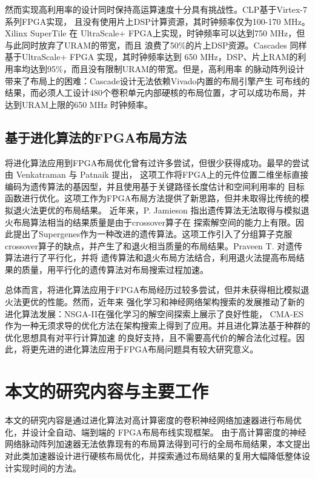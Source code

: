然而实现高利用率的设计同时保持高运算速度十分具有挑战性。CLP基于Virtex-7系列FPGA实现，
且没有使用片上DSP计算资源，其时钟频率仅为100-170 MHz。Xilinx SuperTile 在
UltraScale+ FPGA上实现，时钟频率可以达到750 MHz，但与此同时放弃了URAM的带宽，而且
浪费了50\%的片上DSP资源。Cascades 同样基于UltraScale+ FPGA 实现，其时钟频率达到
650 MHz，DSP、片上RAM的利用率均达到95\%，而且没有限制URAM的带宽。但是，高利用率
的脉动阵列设计带来了布局上的困难：Cascade设计无法依赖Vivado内置的布局引擎产生
可布线的结果，而必须人工设计480个卷积单元内部硬核的布局位置，才可以成功布局，并达到URAM上限的650 MHz
时钟频率。

\subsection{基于进化算法的FPGA布局方法}

将进化算法应用到FPGA布局优化曾有过许多尝试，但很少获得成功。最早的尝试由 Venkatraman 与 Patnaik 提出，
这项工作将FPGA上的元件位置二维坐标直接编码为遗传算法的基因型，并且使用基于关键路径长度估计和空间利用率的
目标函数进行优化。这项工作为FPGA布局方法提供了新思路，但并未取得比传统的模拟退火法更优的布局结果。
近年来，P. Jamieson 指出遗传算法无法取得与模拟退火布局算法相当的结果质量是由于crossover算子在
探索解空间的能力上有限。因此提出了Supergenes作为一种改进的遗传算法。这项工作引入了分组算子克服
crossover算子的缺点，并产生了和退火相当质量的布局结果。Praveen T. 对遗传算法进行了平行化，并将
遗传算法和退火布局方法结合，利用退火法提高布局结果的质量，用平行化的遗传算法对布局搜索过程加速。

总体而言，将进化算法应用于FPGA布局经历过较多尝试，但并未获得相比模拟退火法更优的性能。然而，近年来
强化学习和神经网络架构搜索的发展推动了新的进化算法发展：NSGA-II在强化学习的解空间探索上展示了良好性能，
CMA-ES作为一种无须求导的优化方法在架构搜索上得到了应用。并且进化算法基于种群的优化思想具有对平行计算加速
的良好支持，且不需要高代价的解合法化过程。因此，将更先进的进化算法应用于FPGA布局问题具有较大研究意义。



\section{本文的研究内容与主要工作}

本文的研究内容是通过进化算法对高计算密度的卷积神经网络加速器进行布局优化，并设计全自动、端到端的
FPGA布局布线实现框架。
由于高计算密度的神经网络脉动阵列加速器无法依靠现有的布局算法得到可行的全局布局结果，本文提出
对此类加速器设计进行硬核布局优化，并探索通过布局结果的复用大幅降低整体设计实现时间的方法。

